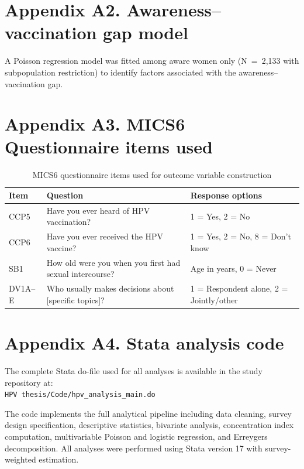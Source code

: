 \section*{Appendix A2. Awareness--vaccination gap model}

A Poisson regression model was fitted among aware women only (N~=~2,133 with subpopulation restriction) to identify factors associated with the awareness--vaccination gap.

\section*{Appendix A3. MICS6 Questionnaire items used}

\begin{table}[htbp]
\caption{MICS6 questionnaire items used for outcome variable construction}
\centering
\small
\begin{tabular}{|p{2.0cm}|p{5.0cm}|p{5.5cm}|}
\hline
\textbf{Item} & \textbf{Question} & \textbf{Response options} \\
\hline
CCP5 & Have you ever heard of HPV vaccination? & 1 = Yes, 2 = No \\
\hline
CCP6 & Have you ever received the HPV vaccine? & 1 = Yes, 2 = No, 8 = Don't know \\
\hline
SB1 & How old were you when you first had sexual intercourse? & Age in years, 0 = Never \\
\hline
DV1A--E & Who usually makes decisions about [specific topics]? & 1 = Respondent alone, 2 = Jointly/other \\
\hline
\end{tabular}
\label{tab:mics_items}
\end{table}

\section*{Appendix A4. Stata analysis code}

The complete Stata do-file used for all analyses is available in the study repository at:\\
\texttt{HPV thesis/Code/hpv\_analysis\_main.do}

The code implements the full analytical pipeline including data cleaning, survey design specification, descriptive statistics, bivariate analysis, concentration index computation, multivariable Poisson and logistic regression, and Erreygers decomposition. All analyses were performed using Stata version 17 with survey-weighted estimation.
